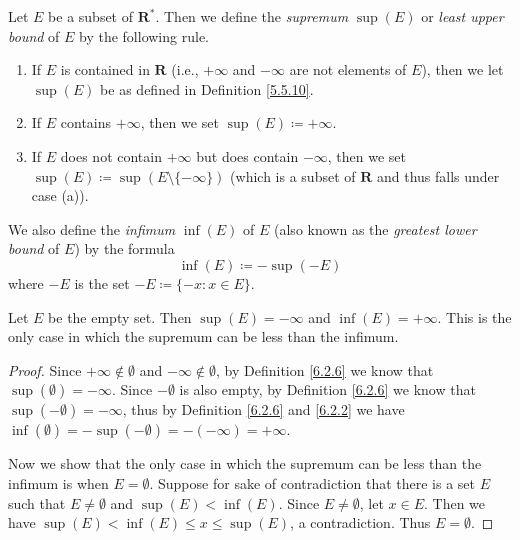 \begin{definition}\label{6.2.6}
    Let \(E\) be a subset of \(\mathbf{R}^*\).
    Then we define the \emph{supremum} \(\sup(E)\) or \emph{least upper bound} of \(E\) by the following rule.
    \begin{enumerate}
        \item If \(E\) is contained in \(\mathbf{R}\) (i.e., \(+\infty\) and \(-\infty\) are not elements of \(E\)), then we let \(\sup(E)\) be as defined in Definition \ref{5.5.10}.
        \item If \(E\) contains \(+\infty\), then we set \(\sup(E) \coloneqq +\infty\).
        \item If \(E\) does not contain \(+\infty\) but does contain \(-\infty\), then we set \(\sup(E) \coloneqq \sup(E \setminus \{-\infty\})\)
              (which is a subset of \(\mathbf{R}\) and thus falls under case (a)).
    \end{enumerate}
    We also define the \emph{infimum} \(\inf(E)\) of \(E\) (also known as the \emph{greatest lower bound} of \(E\)) by the formula
    \[
        \inf(E) \coloneqq -\sup(-E)
    \]
    where \(-E\) is the set \(-E \coloneqq \{-x : x \in E\}\).
\end{definition}

\setcounter{theorem}{9}
\begin{example}\label{6.2.10}
    Let \(E\) be the empty set.
    Then \(\sup(E) = -\infty\) and \(\inf(E) = +\infty\).
    This is the only case in which the supremum can be less than the infimum.
\end{example}

\begin{proof}
    Since \(+\infty \notin \emptyset\) and \(-\infty \notin \emptyset\), by Definition \ref{6.2.6} we know that \(\sup(\emptyset) = -\infty\).
    Since \(-\emptyset\) is also empty, by Definition \ref{6.2.6} we know that \(\sup(-\emptyset) = -\infty\), thus by Definition \ref{6.2.6} and \ref{6.2.2} we have \(\inf(\emptyset) = -\sup(-\emptyset) = -(-\infty) = +\infty\).

    Now we show that the only case in which the supremum can be less than the infimum is when \(E = \emptyset\).
    Suppose for sake of contradiction that there is a set \(E\) such that \(E \neq \emptyset\) and \(\sup(E) < \inf(E)\).
    Since \(E \neq \emptyset\), let \(x \in E\).
    Then we have \(\sup(E) < \inf(E) \leq x \leq \sup(E)\), a contradiction.
    Thus \(E = \emptyset\).
\end{proof}


